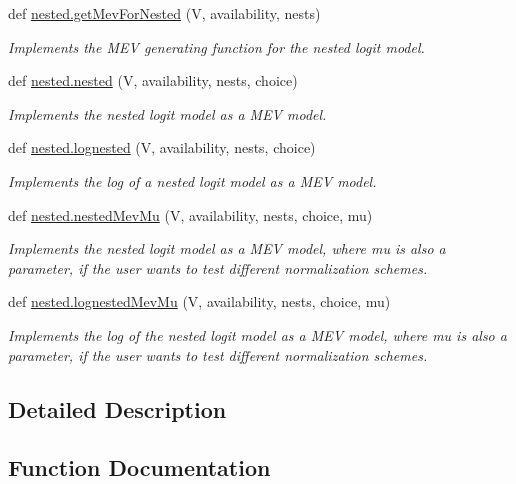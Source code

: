 \begin{DoxyCompactItemize}
def \hyperlink{group__models_ga137c8e126651077da86c84c2558ab440}{nested.\+get\+Mev\+For\+Nested} (V, availability, nests)
\begin{DoxyCompactList}\small\item\em Implements the M\+EV generating function for the nested logit model. \end{DoxyCompactList}\item 
def \hyperlink{group__models_gacd532648885a85e6f0b8aa2450e24c95}{nested.\+nested} (V, availability, nests, choice)
\begin{DoxyCompactList}\small\item\em Implements the nested logit model as a M\+EV model. \end{DoxyCompactList}\item 
def \hyperlink{group__models_ga214ab7d40fbd5f55956681dabaf5949d}{nested.\+lognested} (V, availability, nests, choice)
\begin{DoxyCompactList}\small\item\em Implements the log of a nested logit model as a M\+EV model. \end{DoxyCompactList}\item 
def \hyperlink{group__models_ga2cd8625931f8f303763cebc767ce355e}{nested.\+nested\+Mev\+Mu} (V, availability, nests, choice, mu)
\begin{DoxyCompactList}\small\item\em Implements the nested logit model as a M\+EV model, where mu is also a parameter, if the user wants to test different normalization schemes. \end{DoxyCompactList}\item 
def \hyperlink{group__models_gac121e6462db942150e4df4b2e33bb04c}{nested.\+lognested\+Mev\+Mu} (V, availability, nests, choice, mu)
\begin{DoxyCompactList}\small\item\em Implements the log of the nested logit model as a M\+EV model, where mu is also a parameter, if the user wants to test different normalization schemes. \end{DoxyCompactList}\end{DoxyCompactItemize}


\subsection{Detailed Description}


\subsection{Function Documentation}
